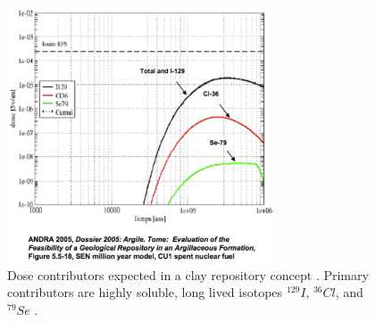 \begin{figure}[htbp!]
  \begin{center}
    \includegraphics[width=0.7\textwidth]{swift_clay_dose.eps}
  \end{center}
  \caption{Dose contributors expected in a clay repository concept 
    \cite{swift_applying_2010}. Primary contributors are highly soluble, long 
    lived isotopes $^{129}I$, $^{36}Cl$, and $^{79}Se$ .}
  \label{fig:swift_clay_dose}
\end{figure}
